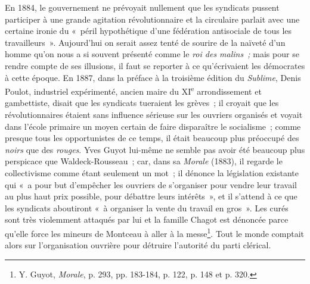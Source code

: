 \documentclass[french,twoside]{book} %
\begin{document}
En 1884, le gouvernement ne prévoyait nullement que les syndicats pussent participer à une grande agitation révolutionnaire et la circulaire parlait avec une certaine ironie du « péril hypothétique d’une fédération antisociale de tous les travailleurs ». Aujourd’hui on serait assez tenté de sourire de la naïveté d’un homme qu’on nous a si souvent présenté comme le \emph{roi des malins ; }mais pour se rendre compte de ses illusions, il faut se reporter à ce qu’écrivaient les démocrates à cette époque. En 1887, dans la préface à la troisième édition du \emph{Sublime}, Denis Poulot, industriel expérimenté,  ancien maire du XI\textsuperscript{e} arrondissement et gambettiste, disait que les syndicats tueraient les grèves ; il croyait que les révolutionnaires étaient sans influence sérieuse sur les ouvriers organisés et voyait dans l’école primaire un moyen certain de faire disparaître le socialisme ; comme presque tous les opportunistes de ce temps, il était beaucoup plus préoccupé des \emph{noirs} que des \emph{rouges}. Yves Guyot lui-même ne semble pas avoir été beaucoup plus perspicace que Waldeck-Rousseau ; car, dans sa \emph{Morale} (1883), il regarde le collectivisme comme étant seulement un mot ; il dénonce la législation existante qui « a pour but d’empêcher les ouvriers de s’organiser pour vendre leur travail au plus haut prix possible, pour débattre leurs intérêts », et il s’attend à ce que les syndicats aboutiront « à organiser la vente du travail en gros ». Les curés sont très violemment attaqués par lui et la famille Chagot est dénoncée parce qu’elle force les mineurs de Montceau à aller à la messe\footnote{ \noindent Y. Guyot, \emph{Morale}, p. 293, pp. 183-184, p. 122, p. 148 et p. 320.
 }. Tout le monde comptait alors sur l’organisation ouvrière pour détruire l’autorité du parti clérical.\par
\end{document}

